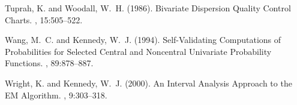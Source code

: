 \documentclass[10pt,letterpaper]{article}
\begin{document}
\begin{thebibliography}{}
Tuprah, K. and Woodall, W.~H. (1986).
\newblock Bivariate {D}ispersion {Q}uality {C}ontrol {C}harts.
,
  15:505--522.

Wang, M.~C. and Kennedy, W.~J. (1994).
\newblock Self-{V}alidating {C}omputations of {P}robabilities for {S}elected
  {C}entral and {N}oncentral {U}nivariate {P}robability {F}unctions.
, 89:878--887.

Wright, K. and Kennedy, W.~J. (2000).
\newblock An {I}nterval {A}nalysis {A}pproach to the {EM} {A}lgorithm.
, 9:303--318.

\end{thebibliography}
\end{document}
